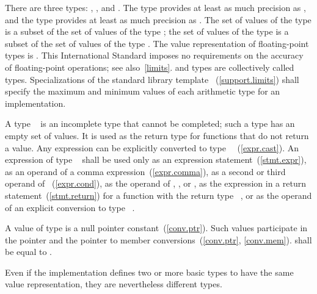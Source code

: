 \pnum
{}%
There are three  types:
%
,
%
,
and
%
. The type  provides at least as much
precision as , and the type  provides at
least as much precision as . The set of values of the type
 is a subset of the set of values of the type
; the set of values of the type  is a subset
of the set of values of the type  . The value
representation of floating-point types is .
%
%
\enternote 
This International Standard imposes no requirements on the accuracy of
floating-point operations; see also~\ref{limits}. 
\exitnote 
{} and  types are collectively
called  types.
%
Specializations of the standard library template
~(\ref{support.limits}) shall specify the
maximum and minimum values of each arithmetic type for an
implementation.

\pnum
{}%
A type \cv\ 
is an incomplete type that cannot be completed; such a type has
an empty set of values. It is used as the return
type for functions that do not return a value. Any expression can be
explicitly converted to type \cv\ ~(\ref{expr.cast}).
An expression of type \cv\  shall
be used only as an expression statement~(\ref{stmt.expr}), as an operand
of a comma expression~(\ref{expr.comma}), as a second or third operand
of ~(\ref{expr.cond}), as the operand of
, , or , as
the expression in a return statement~(\ref{stmt.return}) for a function
with the return type \cv\ , or as the operand of an explicit conversion
to type \cv\ .

\pnum
A value of type  is a null pointer
constant~(\ref{conv.ptr}). Such values participate in the pointer and the
pointer to member conversions~(\ref{conv.ptr}, \ref{conv.mem}).
 shall be equal to .

\pnum
\enternote 
Even if the implementation defines two or more basic types to have the
same value representation, they are nevertheless different types.
\exitnote 


